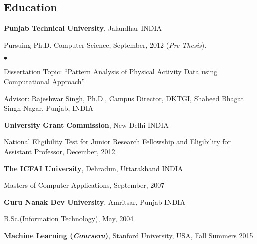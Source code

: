 \documentclass[margin,line]{res}
\newenvironment{list1}{
  \begin{list}{\ding{113}}{%
      \setlength{\itemsep}{0in}
      \setlength{\parsep}{0in} \setlength{\parskip}{0in}
      \setlength{\topsep}{0in} \setlength{\partopsep}{0in}
      \setlength{\leftmargin}{0.17in}}}{\end{list}}
\newenvironment{list2}{
  \begin{list}{$\bullet$}{%
      \setlength{\itemsep}{0in}
      \setlength{\parsep}{0in} \setlength{\parskip}{0in}
      \setlength{\topsep}{0in} \setlength{\partopsep}{0in}
      \setlength{\leftmargin}{0.2in}}}{\end{list}}
\begin{document}
\begin{resume}
\section{\sc Education}
{\bf Punjab Technical University}, Jalandhar INDIA\\
\vspace*{-.1in}
\begin{list1}
\item[] Pursuing Ph.D. Computer Science, September, 2012 (\textit{Pre-Thesis}).
\begin{list2}
\vspace*{.05in}
\item Dissertation Topic:  ``Pattern Analysis of Physical Activity Data using Computational Approach''
\item Advisor:  Rajeshwar Singh, Ph.D., Campus Director, DKTGI, Shaheed Bhagat Singh Nagar, Punjab, INDIA
\end{list2}
\end{list1}

{\bf University Grant Commission}, New Delhi INDIA\\
\vspace*{-.1in}
\begin{list1}
\item[] National Eligibility Test for Junior Research Fellowship and Eligibility for Assistant Professor, December, 2012.
\end{list1}

{\bf The ICFAI University}, Dehradun, Uttarakhand INDIA\\
\vspace*{-.1in}
\begin{list1}
\item[] Masters of Computer Applications,  September, 2007
\end{list1}

{\bf Guru Nanak Dev University}, Amritsar, Punjab INDIA\\
\vspace*{-.1in}
\begin{list1}
\item[] B.Sc.(Information Technology),  May, 2004
\end{list1}

{\bf Machine Learning (\textit{Coursera})}, Stanford University, USA, Fall Summers 2015\\
\vspace*{-.1in}


\end{resume}
\end{document}
